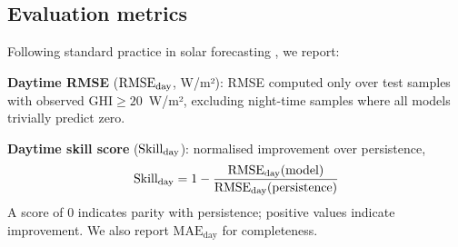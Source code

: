 \subsection{Evaluation metrics}

Following standard practice in solar forecasting \cite{coimbra2013}, we report:

\textbf{Daytime RMSE} ($\text{RMSE}_\text{day}$, W/m²): RMSE computed only over test samples
with observed $\text{GHI} \geq 20$~W/m², excluding night-time samples where all
models trivially predict zero.

\textbf{Daytime skill score} ($\text{Skill}_\text{day}$): normalised improvement over persistence,
\begin{equation}
  \text{Skill}_\text{day} = 1 - \frac{\text{RMSE}_\text{day}(\text{model})}{\text{RMSE}_\text{day}(\text{persistence})}
  \label{eq:skill}
\end{equation}
A score of 0 indicates parity with persistence; positive values indicate improvement.
We also report $\text{MAE}_\text{day}$ for completeness.
